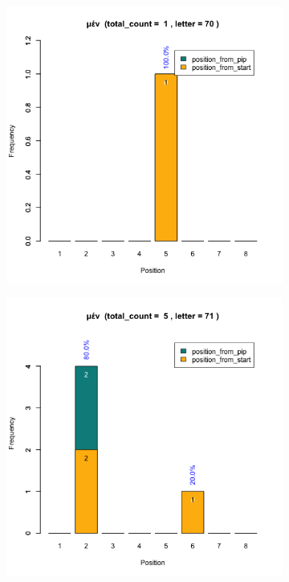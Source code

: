 \documentclass[a4paper]{article}
\begin{document}
\begin{figure}
\begin{subfigure}{0.45\textwidth}
\end{subfigure}
\begin{subfigure}{0.45\textwidth}
\centering
\includegraphics[width=1\linewidth]{../../data/output/paul_R_par/plots/par5_lt70.png}
\end{subfigure}
\begin{subfigure}{0.45\textwidth}
\centering
\includegraphics[width=1\linewidth]{../../data/output/paul_R_par/plots/par5_lt71.png}
\end{subfigure}
\end{figure}
\end{document}
